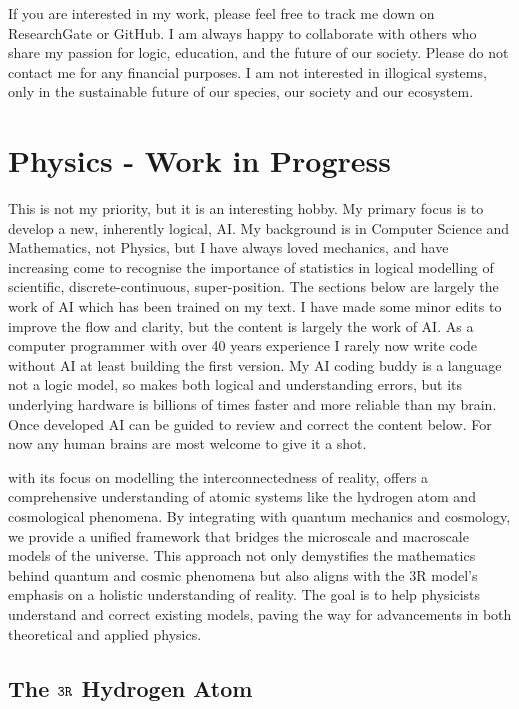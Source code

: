 \documentclass[12pt]{article}
\begin{document}
If you are interested in my work, please feel free to track me down on ResearchGate or GitHub. I am always happy to collaborate with others who share my passion for logic, education, and the future of our society. Please do not contact me for any financial purposes. I am not interested in illogical systems, only in the sustainable future of our species, our society and our ecosystem.

\section*{Physics - \iR{} Work in Progress}

This is not my priority, but it is an interesting hobby. My primary focus is to develop a new, inherently logical, \iR{} AI. My background is in Computer Science and Mathematics, not Physics, but I have always loved mechanics, and have increasing come to recognise the importance of statistics in logical modelling of scientific, discrete-continuous, super-position. The sections below are largely the work of AI which has been trained on my \iR{} text. I have made some minor edits to improve the flow and clarity, but the content is largely the work of AI. As a computer programmer with over 40 years experience I rarely now write code without AI at least building the first version. My AI coding buddy is a language not a logic model, so makes both logical and understanding errors, but its underlying hardware is billions of times faster and more reliable than my brain. Once developed \iR{} AI can be guided to review and correct the content below. For now any human brains are most welcome to give it a shot.

\iR{} with its focus on modelling the interconnectedness of reality, offers a comprehensive understanding of atomic systems like the hydrogen atom and cosmological phenomena. By integrating \iR{} with quantum mechanics and cosmology, we provide a unified framework that bridges the microscale and macroscale models of the universe. This approach not only demystifies the mathematics behind quantum and cosmic phenomena but also aligns with the 3R model's emphasis on a holistic understanding of reality. The goal is to help physicists understand and correct existing models, paving the way for advancements in both theoretical and applied physics.

\subsection*{The \(\texttt{3R}\) Hydrogen Atom}
\end{document}
